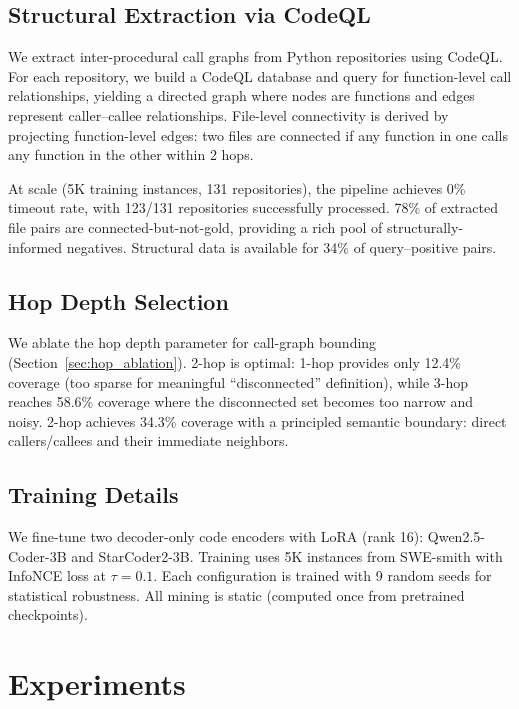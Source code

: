 \documentclass[11pt]{article}
\begin{document}
\subsection{Structural Extraction via CodeQL}

We extract inter-procedural call graphs from Python repositories using CodeQL.
For each repository, we build a CodeQL database and query for function-level call relationships, yielding a directed graph where nodes are functions and edges represent caller--callee relationships.
File-level connectivity is derived by projecting function-level edges: two files are connected if any function in one calls any function in the other within 2 hops.

At scale (5K training instances, 131 repositories), the pipeline achieves 0\% timeout rate, with 123/131 repositories successfully processed.
78\% of extracted file pairs are connected-but-not-gold, providing a rich pool of structurally-informed negatives.
Structural data is available for 34\% of query--positive pairs.

\subsection{Hop Depth Selection}

We ablate the hop depth parameter for call-graph bounding (Section~\ref{sec:hop_ablation}).
2-hop is optimal: 1-hop provides only 12.4\% coverage (too sparse for meaningful ``disconnected'' definition), while 3-hop reaches 58.6\% coverage where the disconnected set becomes too narrow and noisy.
2-hop achieves 34.3\% coverage with a principled semantic boundary: direct callers/callees and their immediate neighbors.

\subsection{Training Details}

We fine-tune two decoder-only code encoders with LoRA (rank 16): Qwen2.5-Coder-3B and StarCoder2-3B.
Training uses 5K instances from SWE-smith with InfoNCE loss at $\tau = 0.1$.
Each configuration is trained with 9 random seeds for statistical robustness.
All mining is static (computed once from pretrained checkpoints).

\section{Experiments}
\label{sec:experiments}
\end{document}
